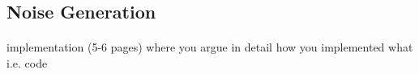 \newpage
\subsection{Noise Generation}\paragraph{}

implementation (5-6 pages) where you argue in detail how you implemented what i.e. code
